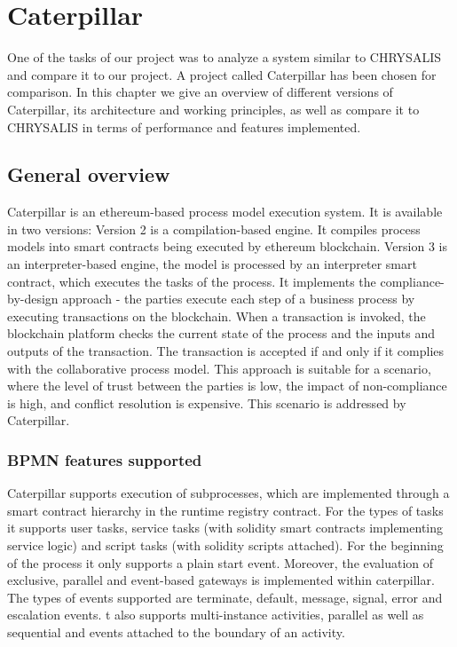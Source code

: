 %
\chapter{Caterpillar}
\label{sec:caterpillar}

One of the tasks of our project was to analyze a system similar to CHRYSALIS and compare it to our project. A project called Caterpillar has been chosen for comparison. In this chapter we give an overview of different versions of Caterpillar, its architecture and working principles, as well as compare it to CHRYSALIS in terms of performance and features implemented.

\section{General overview}
\label{sec:caterpillar:overview}

Caterpillar is an ethereum-based process model execution system. It is available in two versions: Version 2 is a compilation-based engine. It compiles process models into smart contracts being executed by ethereum blockchain. Version 3 is an interpreter-based engine, the model is processed by an interpreter smart contract, which executes the tasks of the process. It implements the compliance-by-design approach - the parties execute each step of a business process by executing transactions on the blockchain. When a transaction is invoked, the blockchain platform checks the current state of the process and the inputs and outputs of the transaction. The transaction is accepted if and only if it complies with the collaborative process model. This approach is suitable for a scenario, where the level of trust between the parties is low, the impact of non-compliance is high, and conflict resolution is expensive. This scenario is addressed by Caterpillar.

\subsection{BPMN features supported}
\label{sec:caterpillar:overview:bpmn}

Caterpillar supports execution of subprocesses, which are implemented through a smart contract hierarchy in the runtime registry contract. For the types of tasks it supports user tasks, service tasks (with solidity smart contracts implementing service logic) and script tasks (with solidity scripts attached). For the beginning of the process it only supports a plain start event. Moreover, the evaluation of exclusive, parallel and event-based gateways is implemented within caterpillar. The types of events supported are terminate, default, message, signal, error and escalation events. t also supports multi-instance activities, parallel as well as sequential and events attached to the boundary of an activity.

